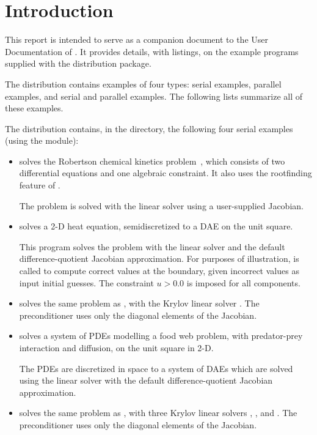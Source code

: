 \section{Introduction}\label{s:ex_intro}

This report is intended to serve as a companion document to the User
Documentation of {\ida} \cite{ida2.4.0_ug}.  It provides details, with
listings, on the example programs supplied with the {\ida} distribution
package.

The {\ida} distribution contains examples of four types: serial
{\C} examples, parallel {\C} examples, and serial and parallel {\F}
examples.  The following lists summarize all of these examples.

The {\ida} distribution contains, in the 
directory, the following four serial examples (using the {\nvecs} module):
\begin{itemize}

\item {}
  solves the Robertson chemical kinetics problem~\cite{Rob:66}, which consists
  of two differential equations and one algebraic constraint.  It also uses
  the rootfinding feature of {\ida}.

  The problem is solved with the {\idadense} linear solver using
  a user-supplied Jacobian.

\item {}
  solves a 2-D heat equation, semidiscretized to a DAE on the unit square.

  This program solves the problem with the {\idaband} linear solver and
  the default difference-quotient Jacobian approximation. For purposes of
  illustration,  is called to compute correct values at the
  boundary, given incorrect values as input initial guesses. The constraint
  $u > 0.0$ is imposed for all components.

\item {}
  solves the same problem as , with the Krylov linear solver
  {\idaspgmr}. The preconditioner uses only the diagonal elements of the 
  Jacobian.

\item {}
  solves a system of PDEs modelling a food web problem, with predator-prey
  interaction and diffusion, on the unit square in 2-D.

  The PDEs are discretized in space to a system of DAEs which are solved
  using the {\idaband} linear solver with the default difference-quotient 
  Jacobian approximation.

\item {}
  solves the same problem as , with three Krylov linear solvers
  {\idaspgmr}, {\idaspbcg}, and {\idasptfqmr}.  The preconditioner uses only
  the diagonal elements of the Jacobian.

\end{itemize}

